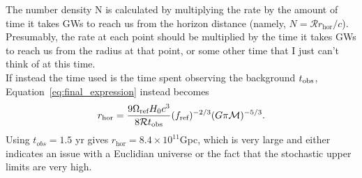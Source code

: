 \documentclass[]{article}
\newcommand{\Ogw}{\Omega_{\mathrm{gw}}}
\begin{document}
The number density N is calculated by multiplying the rate by the amount of time it takes GWs to reach us from the horizon distance (namely, $N = \mathcal{R} r_{\text{hor}}/c$). Presumably, the rate at each point should be multiplied by the time it takes GWs to reach us from the radius at that point, or some other time that I just can't think of at this time.\\

If instead the time used is the time spent observing the background $t_{\rm obs}$, Equation~\ref{eq:final_expression} instead becomes
\begin{equation}
r_{\text{hor}}=\frac{9\Omega_{\text{ref}} H_0 c^3}{8 \mathcal{R} t_{\rm obs}} (f_{\text{ref}})^{-2/3} ( G \pi \mathcal{M})^{-5/3} .
\end{equation}
Using $t_{obs} = 1.5$ yr gives $r_{\text{hor}} = 8.4 \times 10^{11}$Gpc, which is very large and either indicates an issue with a Euclidian universe or the fact that the stochastic upper limits are very high.

%
{}

\end{document}

